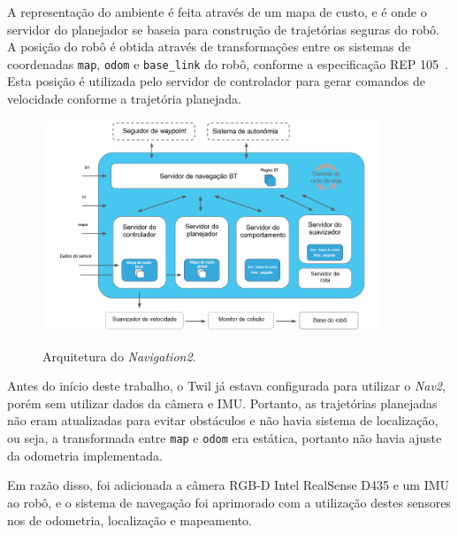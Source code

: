 \documentclass[repeatfields,xlists,xpacks,oneside,yearsonly]{ufrgscca}
\begin{document}
A representação do ambiente é feita através de um mapa de custo, e é onde o servidor do planejador
se baseia para construção de trajetórias seguras do robô.
A posição do robô é obtida através de transformações entre os sistemas de coordenadas \texttt{map},
\texttt{odom} e \texttt{base\_link} do robô, conforme a especificação REP 105~\cite{rep_105}. 
Esta posição é utilizada pelo servidor de controlador para gerar comandos de velocidade conforme
a trajetória planejada.

\begin{figure}[h]
    {
        \centering
        \caption{Arquitetura do \textit{Navigation2}.}
        \label{fig:nav2_arc}
        \includegraphics[width=0.9\textwidth]{nav2_architecture_trad.png}\\
    }
    {} %
\end{figure}

Antes do início deste trabalho, o Twil já estava configurada para utilizar o \textit{Nav2},
porém sem utilizar dados da câmera e IMU. 
Portanto, as trajetórias planejadas não eram atualizadas
para evitar obstáculos e não havia sistema de localização, ou seja,
a transformada entre \texttt{map} e \texttt{odom} era estática, portanto 
não havia ajuste da odometria implementada.

Em razão disso, foi adicionada a câmera RGB-D Intel RealSense D435 e um IMU ao robô,
e o sistema de navegação foi aprimorado com a utilização destes sensores nos
de odometria, localização e mapeamento.

\end{document}
